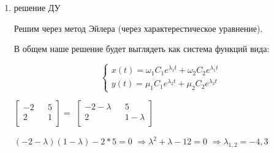 \begin{enumerate}
    \item решение ДУ
    
    Решим через метод Эйлера (через характерестическое уравнение).

    В общем наше решение будет выглядеть как система функций вида:

    \begin{equation*}
        \begin{cases}
          x(t) = \omega_1 C_1 e^{\lambda_1t} + \omega_2 C_2 e^{\lambda_1t}
          \\
          y(t) = \mu_1 C_1 e^{\lambda_2t} + \mu_2 C_2 e^{\lambda_2t}
        \end{cases}
       \end{equation*}
         

    $\displaystyle \begin{bmatrix}
        -2 && 5 \\
        2 && 1 \\
   \end{bmatrix} = $
   $\displaystyle \begin{bmatrix}
       -2 - \lambda && 5 \\
       2 && 1 - \lambda \\
  \end{bmatrix} $

  $(-2-\lambda)(1-\lambda) - 2*5 = 0$
  $\Rightarrow \lambda^2 + \lambda - 12 = 0$
  $\Rightarrow \lambda_{1,2} = -4, 3$

  \begin{multicols}{2}
    \end{multicols}


\end{enumerate}
